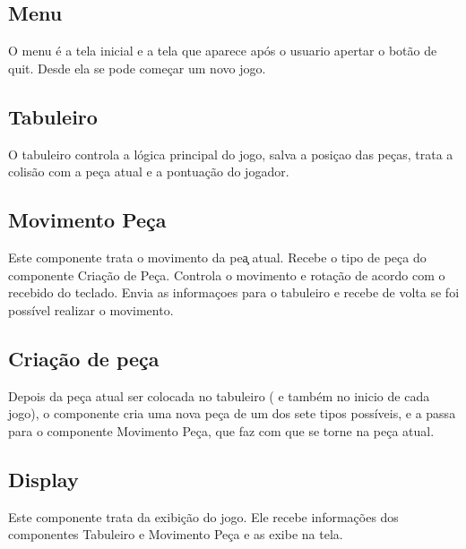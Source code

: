 \documentclass[a4paper,11pt]{article}
\begin{document}
\subsection{Menu}
O menu \'e a tela inicial e a tela que aparece após o usuario apertar o botão de quit. Desde ela se pode come\c{c}ar um novo jogo.

\subsection{Tabuleiro}
O tabuleiro controla a l\'ogica principal do jogo, salva a posi\c{c}ao das pe\c{c}as, trata a colis\~ao com a pe\c{c}a atual e a pontua\c{c}\~ao do jogador. 

\subsection{Movimento Pe\c{c}a}
Este componente trata o movimento da pe\c{a} atual. Recebe o tipo de pe\c{c}a do componente Cria\c{c}\~ao de Pe\c{c}a. Controla o movimento e rota\c{c}\~ao de acordo com o recebido do teclado. Envia as informa\c{c}oes para o tabuleiro e recebe de volta se foi poss\'ivel realizar o movimento.

\subsection{Cria\c{c}\~ao de pe\c{c}a}
Depois da pe\c{c}a atual ser colocada no tabuleiro ( e tamb\'em no inicio de cada jogo), o componente cria uma nova pe\c{c}a de um dos sete tipos poss\'iveis, e a passa para o  componente Movimento Pe\c{c}a, que faz com que se torne na pe\c{c}a atual.

\subsection{Display}
Este componente trata da exibi\c{c}\~ao do jogo. Ele recebe informa\c{c}\~oes dos componentes Tabuleiro e Movimento Pe\c{c}a e as exibe na tela.  
\end{document}
